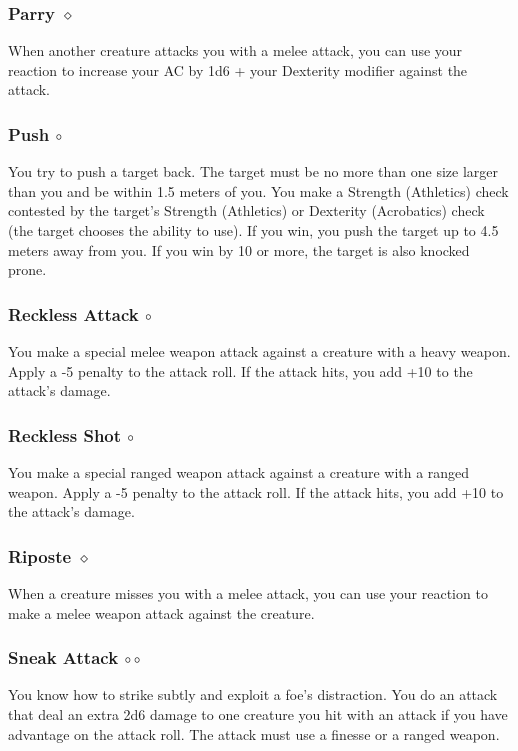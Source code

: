 \subsubsection{Parry $\diamond$} \label{act::parry}
    When another creature attacks you with a melee attack, you can use your reaction to increase your AC by 1d6 + your Dexterity modifier against the attack.

\subsubsection{Push $\circ$} \label{act::push}
    You try to push a target back.
    The target must be no more than one size larger than you and be within 1.5 meters of you.
    You make a Strength (Athletics) check contested by the target's Strength (Athletics) or Dexterity (Acrobatics) check (the target chooses the ability to use).
    If you win, you push the target up to 4.5 meters away from you.
    If you win by 10 or more, the target is also knocked prone.

\subsubsection{Reckless Attack $\circ$} \label{act::recklessattack}
    You make a special melee weapon attack against a creature with a heavy weapon.
    Apply a -5 penalty to the attack roll.
    If the attack hits, you add +10 to the attack's damage.

\subsubsection{Reckless Shot $\circ$} \label{act::recklessshot}
    You make a special ranged weapon attack against a creature with a ranged weapon.
    Apply a -5 penalty to the attack roll.
    If the attack hits, you add +10 to the attack's damage.

\subsubsection{Riposte $\diamond$} \label{act::riposte}
    When a creature misses you with a melee attack, you can use your reaction to make a melee weapon attack against the creature.

\subsubsection{Sneak Attack $\circ\circ$} \label{act::sneakattack}
    You know how to strike subtly and exploit a foe's distraction.
    You do an attack that deal an extra 2d6 damage to one creature you hit with an attack if you have advantage on the attack roll.
    The attack must use a finesse or a ranged weapon.


